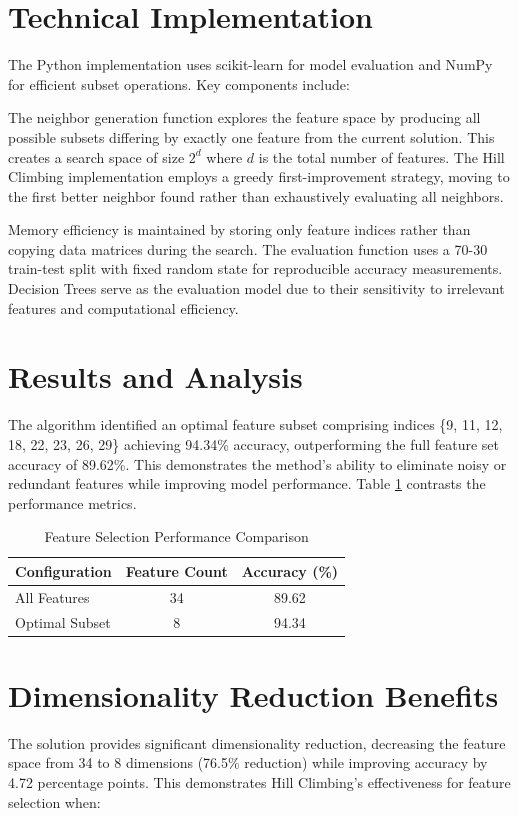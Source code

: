 \documentclass{report}
\begin{document}
	\section{Technical Implementation}
	The Python implementation uses scikit-learn for model evaluation and NumPy for efficient subset operations. Key components include:
	
	The neighbor generation function explores the feature space by producing all possible subsets differing by exactly one feature from the current solution. This creates a search space of size $2^d$ where $d$ is the total number of features. The Hill Climbing implementation employs a greedy first-improvement strategy, moving to the first better neighbor found rather than exhaustively evaluating all neighbors.
	
	Memory efficiency is maintained by storing only feature indices rather than copying data matrices during the search. The evaluation function uses a 70-30 train-test split with fixed random state for reproducible accuracy measurements. Decision Trees serve as the evaluation model due to their sensitivity to irrelevant features and computational efficiency.
	
	\section{Results and Analysis}
	The algorithm identified an optimal feature subset comprising indices \{9, 11, 12, 18, 22, 23, 26, 29\} achieving 94.34\% accuracy, outperforming the full feature set accuracy of 89.62\%. This demonstrates the method's ability to eliminate noisy or redundant features while improving model performance. Table \ref{tab:feature_results} contrasts the performance metrics.
	
	\begin{table}[h]
		\centering
		\caption{Feature Selection Performance Comparison}
		\label{tab:feature_results}
		\begin{tabular}{lcc}
			\toprule
			\textbf{Configuration} & \textbf{Feature Count} & \textbf{Accuracy (\%)} \\
			\midrule
			All Features & 34 & 89.62 \\
			Optimal Subset & 8 & 94.34 \\
			\bottomrule
		\end{tabular}
	\end{table}
	
	\section{Dimensionality Reduction Benefits}
	The solution provides significant dimensionality reduction, decreasing the feature space from 34 to 8 dimensions (76.5\% reduction) while improving accuracy by 4.72 percentage points. This demonstrates Hill Climbing's effectiveness for feature selection when:
	
\end{document}
